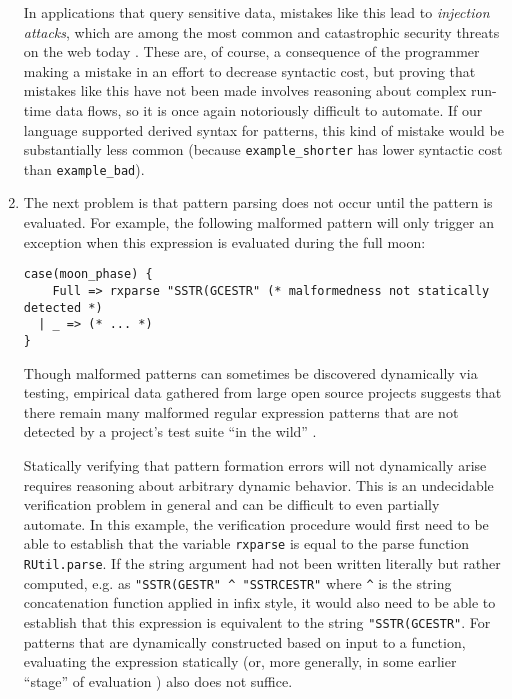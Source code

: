\begin{enumerate}
In applications that query sensitive data, mistakes like this lead to \emph{injection attacks}, which are among the most common and catastrophic security threats on the web today \cite{owasp2013}. These are, of course, a consequence of the programmer making a mistake in an effort to decrease syntactic cost, but proving that mistakes like this have not been made involves reasoning about complex run-time data flows, so it is once again notoriously difficult to automate. If our language supported derived syntax for patterns, this kind of mistake would be substantially less common (because \lstinline{example_shorter} has lower syntactic cost than \lstinline{example_bad}).

\item The next problem is that pattern parsing does not occur until the pattern is evaluated. For example, the following malformed pattern will only trigger an exception when this expression is evaluated during the full moon: %

\begin{lstlisting}[numbers=none]
case(moon_phase) {
    Full => rxparse "SSTR(GCESTR" (* malformedness not statically detected *)
  | _ => (* ... *)
}
\end{lstlisting}
Though malformed patterns can sometimes be discovered dynamically via testing, empirical data gathered from large open source projects suggests that there remain many malformed regular expression patterns that are not detected by a project's test suite ``in the wild'' \cite{spishak2012type}. 

Statically verifying that pattern formation errors will not dynamically arise requires reasoning about arbitrary dynamic behavior. This is an undecidable verification problem in general and can be difficult to even partially automate. In this example, the verification procedure would first need to be able to establish that the variable \lstinline{rxparse} is equal to the parse function \lstinline{RUtil.parse}. If the string argument had not been written literally but rather computed, e.g. as \lstinline{"SSTR(GESTR" ^ "SSTRCESTR"} where \lstinline{^} is the string concatenation function applied in infix style, it would also need to be able to establish that this expression is equivalent to the string \lstinline{"SSTR(GCESTR"}. For patterns that are dynamically constructed based on input to a function, evaluating the expression statically (or, more generally, in some earlier ``stage'' of evaluation \cite{Jones:Gomard:Sestoft:93:PartialEvaluation}) also does not suffice. 


\end{enumerate}
